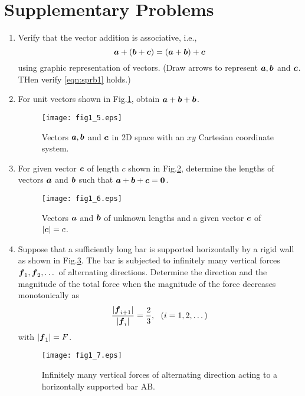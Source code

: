 \documentclass[10pt,a4j]{article}
\begin{document}
\section{Supplementary Problems}
\begin{enumerate}
\item
    Verify that the vector addition is associative, i.e., 
    \begin{equation}
        \mbox{\boldmath $a$}+(\mbox{\boldmath $b$}+\mbox{\boldmath $c$})= (\mbox{\boldmath $a$}+\mbox{\boldmath $b$})+\mbox{\boldmath $c$}
    \label{eqn:sprb1}
    \end{equation}
    using graphic representation of vectors. 
    (Draw arrows to represent $\mbox{\boldmath $a$},\mbox{\boldmath $b$}$ and $\mbox{\boldmath $c$}$. THen verify \ref{eqn:sprb1} holds.)
\item
    For unit vectors shown in Fig.\ref{fig:fig1_5}, obtain $\mbox{\boldmath $a$}+\mbox{\boldmath $b$}+\mbox{\boldmath $b$}$.  
    \begin{figure}[h]
    \begin{center}
    \texttt{[image: fig1\_5.eps]} 
    \end{center}
    \caption{Vectors $\mbox{\boldmath $a$}, \mbox{\boldmath $b$}$ and $\mbox{\boldmath $c$}$ in 2D space with an $xy$ Cartesian coordinate system.}
    \label{fig:fig1_5}
    \end{figure}
\item
    For given vector $\mbox{\boldmath $c$}$ of length $c$ shown in Fig.\ref{fig:fig1_6}, determine the lengths of vectors 
    $\mbox{\boldmath $a$}$ and $\mbox{\boldmath $b$}$ such that $\mbox{\boldmath $a$}+\mbox{\boldmath $b$}+\mbox{\boldmath $c$}=\mbox{\boldmath $0$}$.
    \begin{figure}[h]
    \begin{center}
    \texttt{[image: fig1\_6.eps]} 
    \end{center}
        \caption{
            Vectors $\mbox{\boldmath $a$}$ and $\mbox{\boldmath $b$}$ of unknown lengths and a given vector $\mbox{\boldmath $c$}$ of $|\mbox{\boldmath $c$}|=c$.} 
    \label{fig:fig1_6}
    \end{figure}
\item
    Suppose that a sufficiently long bar is supported horizontally by a rigid wall as shown in Fig.\ref{fig:fig1_7}. The bar is subjected to infinitely many vertical forces $\mbox{\boldmath $f$}_1,\mbox{\boldmath $f$}_2,\dots $ of alternating directions. Determine the direction and the magnitude of the total force when the magnitude of the force decreases monotonically as 
    \begin{equation}
        \frac{| \mbox{\boldmath $f$}_{i+1}|}{|\mbox{\boldmath $f$}_i|}=\frac{2}{3}, \ \ (i=1,2,\dots)
        \label{eqn:}
    \end{equation}
 with $|\mbox{\boldmath $f$}_1|=F$.
    \begin{figure}[h]
    \begin{center}
    \texttt{[image: fig1\_7.eps]} 
    \end{center}
    \caption{Infinitely many vertical forces of alternating direction acting to a horizontally supported bar AB.}
    \label{fig:fig1_7}
    \end{figure}
\end{enumerate}
\end{document}
